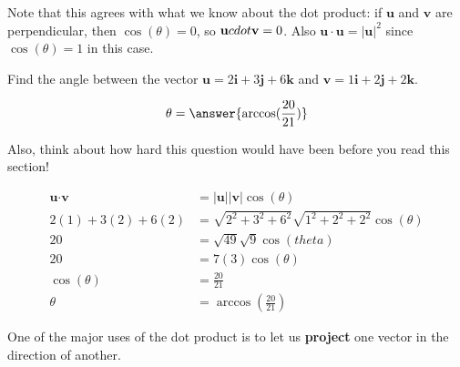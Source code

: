\documentclass{ximera}
\begin{document}
Note that this agrees with what we know about the dot product:  if $\textbf{u}$ and $\textbf{v}$ are perpendicular, then $\cos(\theta) = 0$, so $\textbf{u} \\cdot \textbf{v} = 0$.  Also $\textbf{u} \cdot \textbf{u} = |\textbf{u}|^2$ since $\cos(\theta) = 1$ in this case.

\begin{question}
	Find the angle between the vector $\textbf{u} = 2\textbf{i}+3\textbf{j}+6\textbf{k}$ and $\textbf{v} = 1\textbf{i}+2\textbf{j}+2\textbf{k}$.
	
	\[
	\theta = \answer{ \arccos(\frac{20}{21})}
	\]
	
	Also, think about how hard this question would have been before you read this section!
	
	\begin{hint}
		\begin{align*}
		\textbf{u} \cdot \textbf{v} &= |\textbf{u}||\textbf{v}|\cos(\theta)\\
		2(1)+3(2)+6(2)&= \sqrt{2^2+3^2+6^2}\sqrt{1^2+2^2+2^2}\cos(\theta)\\
		20 &= \sqrt{49}\sqrt{9}\cos(theta)\\
		20 &=7(3)\cos(\theta)\\
		\cos(\theta) &= \frac{20}{21}\\
		\theta &= \arccos(\frac{20}{21})
		\end{align*}
	\end{hint}
	
\end{question}

One of the major uses of the dot product is to let us \textbf{project} one vector in the direction of another.

\end{document}
